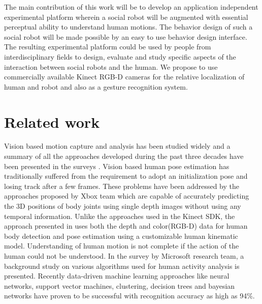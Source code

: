 \documentclass{llncs}
\begin{document}
The main contribution of this work will be to develop an application independent experimental platform wherein a social robot will be augmented with essential perceptual ability to understand human motions. The behavior design of such a social robot will be made possible by an easy to use behavior design interface. The resulting experimental platform could be used by people from interdisciplinary fields to design, evaluate and study specific aspects of the interaction between social robots and the human. We propose to use commercially available Kinect RGB-D cameras for the relative localization of human and robot and also as a gesture recognition system.
%
%
\section{Related work}
%
%
	Vision based motion capture and analysis has been studied widely and a summary of all the approaches developed during the past three decades have been presented in the surveys \cite{Moeslund2001231}\cite{Moeslund200690}\cite{Poppe20074}. Vision based human pose estimation has traditionally suffered from the requirement to adopt an initialization pose and losing track after a few frames. These problems have been addressed by the approaches proposed by Xbox\cite{Kinect2014} team which are capable of accurately predicting the 3D positions of body joints using single depth images without using any temporal information\cite{Shotton2013}. Unlike the approaches used in the Kinect SDK, the approach presented in \cite{Buys201439} uses both the depth and color(RGB-D) data for human body detection and pose estimation using a customizable human kinematic model. Understanding of human motion is not complete if the action of the human could not be understood. In the survey by Microsoft research team\cite{KinectCV2013}, a background study on various algorithms used for human activity analysis is presented. Recently data-driven machine learning approaches like neural networks, support vector machines, clustering, decision trees and bayesian networks have proven to be successful with recognition accuracy as high as 94\%\cite{Kinect2014}.\\
	
\end{document}
